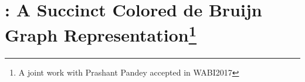  






%
\chapter{\system: A Succinct Colored de Bruijn Graph Representation\protect\footnote{A joint work with Prashant Pandey accepted in WABI2017}}
\label{sec:rainbowfish}

